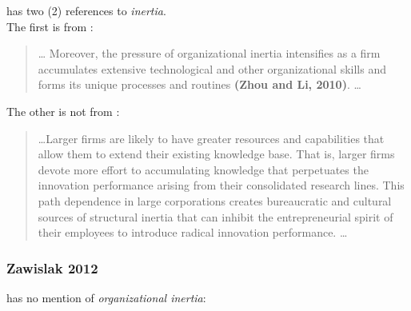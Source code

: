 \cite{fores2016does} has two (2) references to \textit{inertia}.\\

The first is from \cite{zhou2010technological}:\\
\begin{quotation}
\ldots 
Moreover, the pressure of organizational inertia intensifies as a firm accumulates
extensive technological and other organizational skills and forms its unique processes and
routines \textbf{(Zhou and Li, 2010)}. \ldots
\end{quotation}

The other is not from \cite{zhou2010technological}:\\
\begin{quotation}
\ldots Larger firms are likely to have greater resources and capabilities that allow them
to extend their existing knowledge base. That is, larger firms devote more effort to
accumulating knowledge that perpetuates the innovation performance arising from their
consolidated research lines. This path dependence in large corporations creates bureaucratic
and cultural sources of structural inertia that can inhibit the entrepreneurial spirit of their
employees to introduce radical innovation performance. \ldots
\end{quotation}

\subsubsection{Zawislak 2012}

\cite{zawislak2012innovation} has no mention of \textit{organizational inertia}:

